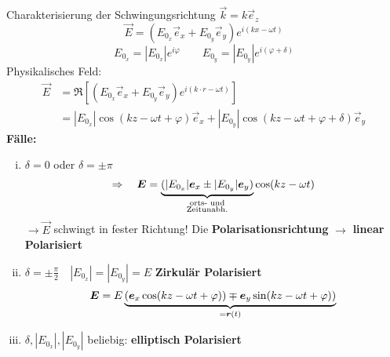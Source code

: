 Charakterisierung der Schwingungsrichtung $ \vec{k} = k \vec{e}_z $
\begin{equation*}
\vec{E} = (E_{0_x} \vec{e}_x + E_{0_y} \vec{e}_y) e^{i(kx - \omega t)}
\end{equation*}
\begin{equation*}
E_{0_x} = |E_{0_x}| e^{i \varphi} \qquad E_{0_y} = |E_{0_y}| e^{i (\varphi + \delta)}
\end{equation*}
Physikalisches Feld:
\begin{align*}
\vec{E} &= \Re \left[ (E_{0_x} \vec{e}_x + E_{0_y} \vec{e}_y) e^{i(k \cdot r - \omega t)} \right]\\
&= |E_{0_x}| \cos(kz - \omega t + \varphi) \vec{e}_x + |E_{0_y}| \cos(kz - \omega t + \varphi + \delta) \vec{e}_y
\end{align*}
\textbf{Fälle:}\\
\begin{enumerate}[i)]
	\item
	$ \delta = 0 $ oder $ \delta = \pm \pi $
	\begin{equation*}
	\Rightarrow \quad \vec{E} = \ub{(|E_{0_x}| \vec{e}_x \pm |E_{0_y}| \vec{e}_y)}_{\mathclap{\substack{\tx{orts- und} \\ \tx{Zeitunabh.}}}} \cos(kz - \omega t)
	\end{equation*}
	$ \rightarrow \vec{E} $ schwingt in fester Richtung! Die \textbf{Polarisationsrichtung}
	$ \rightarrow $ \textbf{linear Polarisiert}
	\item
	$ \delta = \pm \frac{\pi}{2} \quad |E_{0_x}| = |E_{0_y}| = E $
	\textbf{Zirkulär Polarisiert}
	\begin{align*}
	\bm{E} = E\underbrace{(\bm{e}_x \cos(kz - \omega t + \varphi)) \mp \bm{e}_y \sin(kz - \omega t + \varphi))}_{ = \bm{r} (t)}
	\end{align*}
	\item
	$ \delta , |E_{0_x}|, |E_{0_y}| $ beliebig:
	\textbf{elliptisch Polarisiert}
\end{enumerate}
